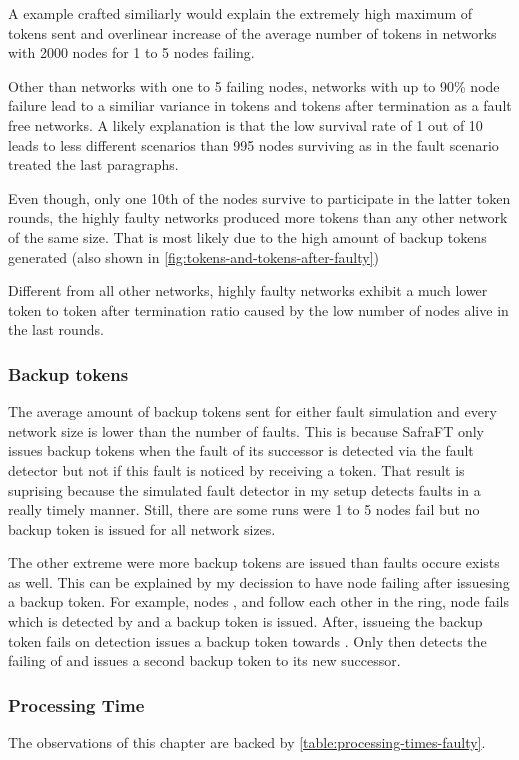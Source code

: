 A example crafted similiarly would explain the extremely high maximum of tokens sent and overlinear increase of the average number of tokens in networks with 2000 nodes for 1 to 5 nodes failing.

Other than networks with one to 5 failing nodes, networks with up to 90\% node failure lead to a similiar variance in tokens and tokens after termination as a fault free networks.
A likely explanation is that the low survival rate of 1 out of 10 leads to less different scenarios than 995 nodes surviving as in the fault scenario treated the last paragraphs.

Even though, only one 10th of the nodes survive to participate in the latter token rounds, the highly faulty networks produced more tokens than any other network of the same size.
That is most likely due to the high amount of backup tokens generated (also shown in \cref{fig:tokens-and-tokens-after-faulty})

Different from all other networks, highly faulty networks exhibit a much lower token to token after termination ratio caused by the low number of nodes alive in the last rounds.
    
\subsubsection{Backup tokens}
The average amount of backup tokens sent for either fault simulation and every network size is lower than the number of faults.
This is because SafraFT only issues backup tokens when the fault of its successor is detected via the fault detector but not if this fault is noticed by receiving a token.
That result is suprising because the simulated fault detector in my setup detects faults in a really timely manner.
Still, there are some runs were 1 to 5 nodes fail but no backup token is issued for all network sizes. 

The other extreme were more backup tokens are issued than faults occure exists as well.
This can be explained by my decission to have node failing after issuesing a backup token.
For example, nodes ,  and  follow each other in the ring, node  fails which is detected by  and a backup token is issued.
After, issueing the backup token  fails on detection  issues a backup token towards .
Only then  detects the failing of  and issues a second backup token to its new successor.  


\subsubsection{Processing Time}
The observations of this chapter are backed by \cref{table:processing-times-faulty}.

